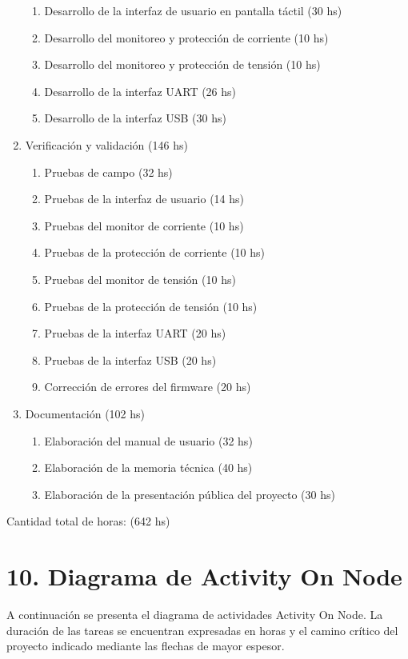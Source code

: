 \documentclass[
11pt, %
codirector, %
]{charter}
\begin{document}
\begin{enumerate}
\begin{enumerate}
	\item Desarrollo de la interfaz de usuario en pantalla táctil (30 hs)
	\item Desarrollo del monitoreo y protección de corriente (10 hs)
	\item Desarrollo del monitoreo y protección de tensión (10 hs)
	\item Desarrollo de la interfaz UART (26 hs)
	\item Desarrollo de la interfaz USB (30 hs)
	\end{enumerate}
\item Verificación y validación (146 hs)
	\begin{enumerate}
	\item Pruebas de campo (32 hs)
	\item Pruebas de la interfaz de usuario (14 hs)
	\item Pruebas del monitor de corriente (10 hs)
	\item Pruebas de la protección de corriente (10 hs)
	\item Pruebas del monitor de tensión (10 hs)
	\item Pruebas de la protección de tensión (10 hs)
	\item Pruebas de la interfaz UART (20 hs)
	\item Pruebas de la interfaz USB (20 hs)
	\item Corrección de errores del firmware (20 hs)
	\end{enumerate}
\item Documentación (102 hs)
	\begin{enumerate}
	\item Elaboración del manual de usuario (32 hs)
	\item Elaboración de la memoria técnica (40 hs)
	\item Elaboración de la presentación pública del proyecto (30 hs)
	\end{enumerate}
\end{enumerate}

Cantidad total de horas: (642 hs)

\section{10. Diagrama de Activity On Node}
\label{sec:AoN}

A continuación se presenta el diagrama de actividades Activity On Node. La duración de las tareas se encuentran expresadas en horas y el camino crítico del proyecto indicado mediante las flechas de mayor espesor.
\end{document}
